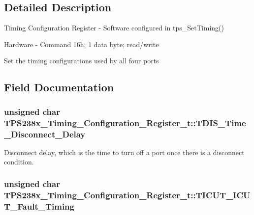 \subsection{Detailed Description}
Timing Configuration Register -\/ Software configured in tps\-\_\-\-Set\-Timing() \par
 Hardware -\/ Command 16h; 1 data byte; read/write \par
\par
 Set the timing configurations used by all four ports 

\subsection{Field Documentation}
\hypertarget{struct_t_p_s238x___timing___configuration___register__t_a125cc8ba8c1d5ed16d952646256c9120}{
\subsubsection[{T\-D\-I\-S\-\_\-\-Time\-\_\-\-Disconnect\-\_\-\-Delay}]{\setlength{\rightskip}{0pt plus 5cm}unsigned char T\-P\-S238x\-\_\-\-Timing\-\_\-\-Configuration\-\_\-\-Register\-\_\-t\-::\-T\-D\-I\-S\-\_\-\-Time\-\_\-\-Disconnect\-\_\-\-Delay}}\label{struct_t_p_s238x___timing___configuration___register__t_a125cc8ba8c1d5ed16d952646256c9120}


Disconnect delay, which is the time to turn off a port once there is a disconnect condition. 

\hypertarget{struct_t_p_s238x___timing___configuration___register__t_a6adbf61b88c9a0c9b6a1d108afa55e93}{
\subsubsection[{T\-I\-C\-U\-T\-\_\-\-I\-C\-U\-T\-\_\-\-Fault\-\_\-\-Timing}]{\setlength{\rightskip}{0pt plus 5cm}unsigned char T\-P\-S238x\-\_\-\-Timing\-\_\-\-Configuration\-\_\-\-Register\-\_\-t\-::\-T\-I\-C\-U\-T\-\_\-\-I\-C\-U\-T\-\_\-\-Fault\-\_\-\-Timing}}\label{struct_t_p_s238x___timing___configuration___register__t_a6adbf61b88c9a0c9b6a1d108afa55e93}


